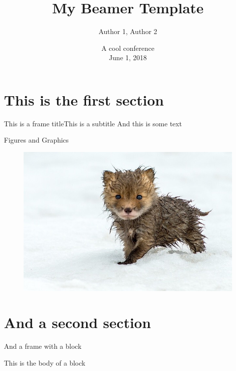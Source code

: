 \documentclass[xcolor=svgnames, 10pt, aspectratio=169]{beamer}
\title{ \color{myblue} \titlefont \LARGE My Beamer Template}
\date{\vfill \color{myblue} \titlefont A cool conference \\[4pt] June 1, 2018}
\author[shortname]{
                   Author 1\inst{1},
                   Author 2\inst{2}
                }
\institute[shortinst]{
                      \inst{1} University 1 \\ 
                      \inst{2} University 2 
                     }
\begin{document}

\section{This is the first section} 


\begin{frame}{This is a frame title}{This is a subtitle}
    And this is some text
\end{frame}


\begin{frame}{Figures and Graphics}
    \begin{figure}
        \centering
        \includegraphics[scale=0.3]{fox}
    \end{figure}
\end{frame}


\section{And a second section}


\begin{frame}{And a frame with a block}

    \begin{tcolorbox}[title=This is the title of a block]
    This is the body of a block 
    \end{tcolorbox}

\end{frame}
\end{document}
